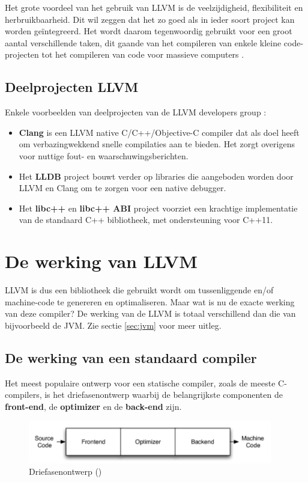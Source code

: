 Het grote voordeel van het gebruik van LLVM is de veelzijdigheid, flexibiliteit en herbruikbaarheid. Dit wil zeggen dat het zo goed als in ieder soort project kan worden geïntegreerd. Het wordt daarom tegenwoordig gebruikt voor een groot aantal verschillende taken, dit gaande van het compileren van enkele kleine code-projecten tot het compileren van code voor massieve computers \autocite{LLVM}.

\subsection{Deelprojecten LLVM}
Enkele voorbeelden van deelprojecten van de LLVM developers group \autocite{LLVM}:
\begin{itemize}
	\item \textbf{Clang} is een LLVM native C/C++/Objective-C compiler dat als doel heeft om verbazingwekkend snelle compilaties aan te bieden. Het zorgt overigens voor nuttige fout- en waarschuwingsberichten.
	\item Het \textbf{LLDB} project bouwt verder op libraries die aangeboden worden door LLVM en Clang om te zorgen voor een native debugger.
	\item Het \textbf{libc++} en \textbf{libc++ ABI} project voorziet een krachtige implementatie van de standaard C++ bibliotheek, met ondersteuning voor C++11. 
\end{itemize}

\section{De werking van LLVM}
LLVM is dus een bibliotheek die gebruikt wordt om tussenliggende en/of machine-code te genereren en optimaliseren. Maar wat is nu de exacte werking van deze compiler? De werking van de LLVM is totaal verschillend dan die van bijvoorbeeld de JVM. Zie sectie \ref{sec:jvm} voor meer uitleg.

\subsection{De werking van een standaard compiler}
Het meest populaire ontwerp voor een statische compiler, zoals de meeste C-compilers, is het driefasenontwerp waarbij de belangrijkste componenten de \textbf{front-end}, de \textbf{optimizer} en de \textbf{back-end} zijn. 

\begin{figure} [ht]
	\centering
	\includegraphics[width=0.95\textwidth]{img/driefasenmodel}
	\caption{Driefasenontwerp (\cite{aosa})}
	\label{fig:driefasenontwerp}
\end{figure}


